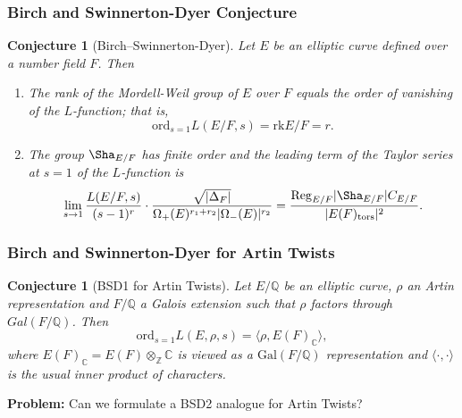 \documentclass{beamer}
\newcommand{\Gal}{\mathrm{Gal}}
\newcommand{\BSD}{\mathrm{BSD}}
\newcommand{\tors}{\mathrm{tors}}
\newcommand{\Reg}{\mathrm{Reg}}
\newcommand{\rk}{\mathrm{rk}}
\newcommand{\ord}{\mathrm{ord}}
\newcommand{\CC}{\mathbb{C}}
\newcommand{\QQ}{\mathbb{Q}}
\newcommand{\ZZ}{\mathbb{Z}}
\theoremstyle{plain}
\newtheorem{conjecture}[thm]{Conjecture}
\begin{document}
\begin{frame}
    \frametitle{Birch and Swinnerton-Dyer Conjecture}
    \begin{conjecture}[Birch--Swinnerton-Dyer]
        Let $E$ be an elliptic curve defined over a number field $F$. Then 
        \begin{enumerate}%
            \item The rank of the Mordell-Weil group of $E$ over $F$ equals the order of vanishing of the $L$-function; that is,
            $$\ord_{s=1}L(E/F,s)=\rk E/F = r.$$ \pause
            \item The group $\Sha_{E / F}$ has finite order and the leading term of the Taylor series at $s=1$ of the $L$-function is
            \begin{equation*}\label{BSD_2}
                \lim_{s\to1}\frac{L(E/F,s)}{(s-1)^r}\cdot\frac{\sqrt{|\Delta_F|}}{\Omega_+(E)^{r_1+r_2}|\Omega_-(E)|^{r_2}}=\frac{\Reg_{E/F}|\Sha_{E/F}|C_{E/F}}{|E(F)_{\tors}|^2}.
            \end{equation*}
        \end{enumerate}
    \end{conjecture}
    

\end{frame}

\begin{frame}
    \frametitle{Birch and Swinnerton-Dyer for Artin Twists}
    \begin{conjecture}[BSD1 for Artin Twists]
        Let $E/\QQ$ be an elliptic curve, $\rho$ an Artin representation and $F/\QQ$ a Galois extension such that $\rho$ factors through $Gal(F/\QQ)$. Then
        $$\ord_{s=1}L(E,\rho,s)=\langle\rho,E(F)_\CC\rangle,$$
        where $E(F)_\CC=E(F)\otimes_\ZZ \CC$ is viewed as a $\Gal(F/\QQ)$ representation and $\langle\cdot,\cdot\rangle$ is the usual inner product of characters.
    \end{conjecture} \pause
    \textbf{Problem:} Can we formulate a BSD2 analogue for Artin Twists?
\end{frame}
\end{document}
